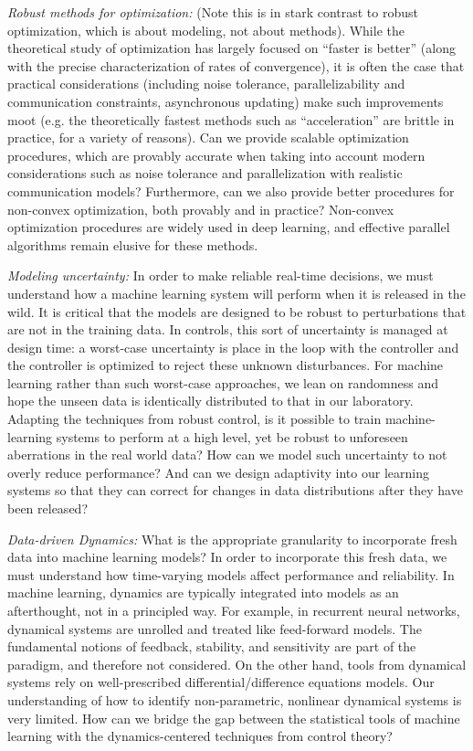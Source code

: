 {\em Robust methods for optimization:}  (Note this is in stark contrast to robust optimization, which is about modeling, not about methods).    While the theoretical study of optimization has largely focused on ``faster is better'' (along with the precise characterization of rates of convergence), it is often the case that practical considerations (including noise tolerance, parallelizability and communication constraints, asynchronous updating) make such improvements moot (e.g. the theoretically fastest methods such as ``acceleration'' are brittle in practice, for a variety of reasons). Can we provide scalable optimization procedures, which are provably accurate when taking into account modern considerations such as noise tolerance and parallelization with realistic communication models? Furthermore, can we also provide better procedures for non-convex optimization, both provably and in practice? Non-convex optimization procedures are widely used in deep learning, and effective parallel algorithms remain elusive for these methods.

{\em Modeling uncertainty:} In order to make reliable real-time decisions, we must understand how a machine learning system will perform when it is released in the wild.  It is critical that the models are designed to be robust to perturbations that are not in the training data.  In controls, this sort of uncertainty is managed at design time: a worst-case uncertainty is place in the loop with the controller and the controller is optimized to reject these unknown disturbances.  For machine learning rather than such worst-case approaches, we lean on randomness and hope the unseen data is identically distributed to that in our laboratory.  Adapting the techniques from robust control, is it possible to train machine-learning systems to perform at a high level, yet be robust to unforeseen aberrations in the real world data?  How can we model such uncertainty to not overly reduce performance?  And can we design adaptivity into our learning systems so that they can correct for changes in data distributions after they have been released?

{\em Data-driven Dynamics:}  What is the appropriate granularity to incorporate fresh data into machine learning models?  In order to incorporate this fresh data, we must understand how time-varying models affect performance and reliability.  In machine learning, dynamics are typically integrated into models as an afterthought, not in a principled way.  For example, in recurrent neural networks, dynamical systems are unrolled and treated like feed-forward models.  The fundamental notions of feedback, stability, and sensitivity are part of the paradigm, and therefore not considered.  On the other hand, tools from dynamical systems rely on well-prescribed differential/difference equations models.  Our understanding of how to identify non-parametric, nonlinear dynamical systems is very limited.  How can we bridge the gap between the statistical tools of machine learning with the dynamics-centered techniques from control theory?
